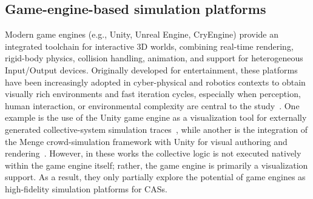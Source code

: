 \documentclass[runningheads]{llncs}
\begin{document}
%
\subsection{Game-engine-based simulation platforms}\label{sec:game-engines}

Modern game engines (e.g., Unity, Unreal Engine, CryEngine) provide an integrated toolchain for
interactive 3D worlds, combining real-time rendering, rigid-body physics, collision handling,
animation, and support for heterogeneous Input/Output devices.
%
Originally developed for entertainment, these platforms have been increasingly adopted in
cyber-physical and robotics contexts to obtain visually rich environments and fast iteration
cycles, especially when perception, human interaction, or environmental complexity are central
to the study~\cite{Coronado2023XRGameEngines}.
%
One example is the use of the Unity game engine as a visualization tool for
externally generated collective-system simulation traces~\cite{DelGiudice2024SequitSibilla},
while another is the integration of the Menge crowd-simulation framework with Unity for visual authoring and rendering~\cite{CrowdSimulationInUnity}.
%
However,
in these works the collective logic is not executed natively within the game engine itself;
rather,
the game engine is primarily a visualization support.
%
As a result, they only partially explore the potential of game engines as high-fidelity simulation
platforms for \acp{CAS}.
\end{document}
